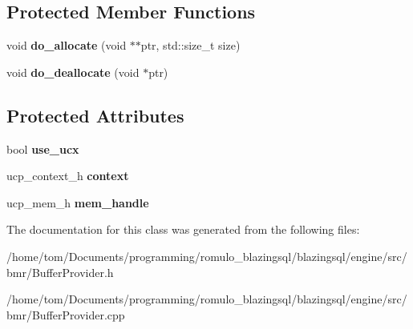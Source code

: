 \subsection*{Protected Member Functions}
\begin{DoxyCompactItemize}
\item 
\mbox{\label{classral_1_1memory_1_1pinned__allocator_a43b29a370a25b86b7754d514194a184e}} 
void {\bfseries do\+\_\+allocate} (void $\ast$$\ast$ptr, std\+::size\+\_\+t size)
\item 
\mbox{\label{classral_1_1memory_1_1pinned__allocator_a8d27e20282e57a4350446891e1851129}} 
void {\bfseries do\+\_\+deallocate} (void $\ast$ptr)
\end{DoxyCompactItemize}
\subsection*{Protected Attributes}
\begin{DoxyCompactItemize}
\item 
\mbox{\label{classral_1_1memory_1_1pinned__allocator_a6c76501acab8d6bfa975633c6ab957f2}} 
bool {\bfseries use\+\_\+ucx}
\item 
\mbox{\label{classral_1_1memory_1_1pinned__allocator_aaab66ee7b19c2dc0bc005c979bd7c389}} 
ucp\+\_\+context\+\_\+h {\bfseries context}
\item 
\mbox{\label{classral_1_1memory_1_1pinned__allocator_ad410fbbcc3cb4701cd73eb694191fd14}} 
ucp\+\_\+mem\+\_\+h {\bfseries mem\+\_\+handle}
\end{DoxyCompactItemize}


The documentation for this class was generated from the following files\+:\begin{DoxyCompactItemize}
\item 
/home/tom/\+Documents/programming/romulo\+\_\+blazingsql/blazingsql/engine/src/bmr/Buffer\+Provider.\+h\item 
/home/tom/\+Documents/programming/romulo\+\_\+blazingsql/blazingsql/engine/src/bmr/Buffer\+Provider.\+cpp\end{DoxyCompactItemize}
